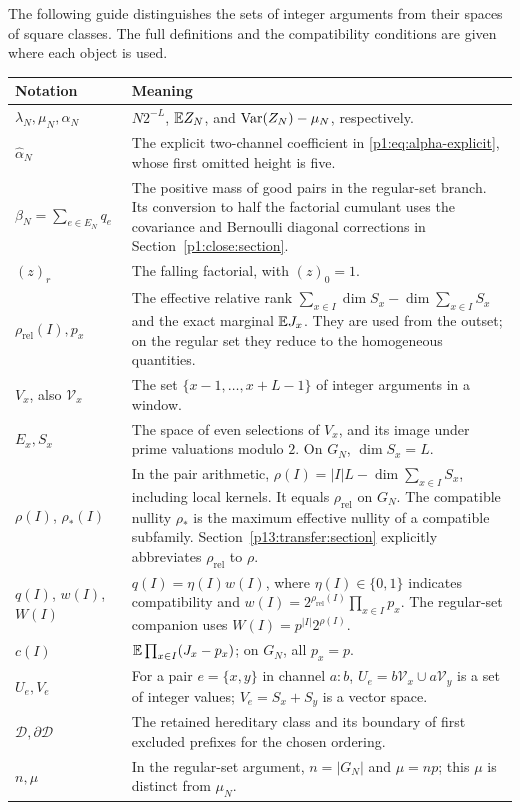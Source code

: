 The following guide distinguishes the sets of integer arguments
from their spaces of square classes. The full definitions and
the compatibility conditions are given where each object is used.

\begin{center}
\small
\begin{tabularx}{\textwidth}{@{}>{\raggedright\arraybackslash}p{}>{\raggedright\arraybackslash}X@{}}
\toprule
Notation & Meaning\\
\midrule
\(\lambda_N,\mu_N,\alpha_N\)
& \(N2^{-L}\), \(\mathbb E Z_N\), and
\(\operatorname{Var}(Z_N)-\mu_N\), respectively.\\[3pt]
\(\widehat\alpha_N\)
& The explicit two-channel coefficient in
\eqref{p1:eq:alpha-explicit}, whose first omitted height
is five.\\[3pt]
\(\beta_N=\sum_{e\in E_N}q_e\)
& The positive mass of good pairs in the regular-set branch.
Its conversion to half
the factorial cumulant uses the covariance and Bernoulli
diagonal corrections in Section~\ref{p1:close:section}.\\[3pt]
\((z)_r\)
& The falling factorial, with \((z)_0=1\).\\[3pt]
\(\rho_{\mathrm{rel}}(I),p_x\)
& The effective relative rank
\(\sum_{x\in I}\dim S_x-\dim\sum_{x\in I}S_x\)
and the exact marginal \(\mathbb E J_x\).
They are used from the outset; on the regular set they
reduce to the homogeneous quantities.\\[3pt]
\(V_x\), also \(\mathcal V_x\)
& The set \(\{x-1,\ldots,x+L-1\}\) of integer
arguments in a window.\\[3pt]
\(E_x,S_x\)
& The space of even selections of \(V_x\), and its image
under prime valuations modulo \(2\).
On \(G_N\), \(\dim S_x=L\).\\[3pt]
\(\rho(I)\), \(\rho_*(I)\)
& In the pair arithmetic, \(\rho(I)=|I|L-\dim\sum_{x\in I}S_x\),
including local kernels. It equals \(\rho_{\mathrm{rel}}\) on \(G_N\).
The compatible nullity \(\rho_*\) is the maximum effective nullity
of a compatible subfamily. Section~\ref{p13:transfer:section}
explicitly abbreviates \(\rho_{\mathrm{rel}}\) to \(\rho\).\\[3pt]
\(q(I)\), \(w(I)\), \(W(I)\)
& \(q(I)=\eta(I)w(I)\), where \(\eta(I)\in\{0,1\}\)
indicates compatibility and
\(w(I)=2^{\rho_{\mathrm{rel}}(I)}\prod_{x\in I}p_x\).
The regular-set companion uses \(W(I)=p^{|I|}2^{\rho(I)}\).\\[3pt]
\(c(I)\)
& \(\mathbb E\prod_{x\in I}(J_x-p_x)\); on \(G_N\),
all \(p_x=p\).\\[3pt]
\(U_e,V_e\)
& For a pair \(e=\{x,y\}\) in channel \(a:b\),
\(U_e=b\mathcal V_x\cup a\mathcal V_y\) is a set
of integer values; \(V_e=S_x+S_y\) is a vector space.\\[3pt]
\(\mathscr D,\partial\mathscr D\)
& The retained hereditary class and its boundary of
first excluded prefixes for the chosen ordering.\\[3pt]
\(n,\mu\)
& In the regular-set argument, \(n=|G_N|\) and
\(\mu=np\); this \(\mu\) is distinct from \(\mu_N\).\\
\bottomrule
\end{tabularx}
\end{center}

